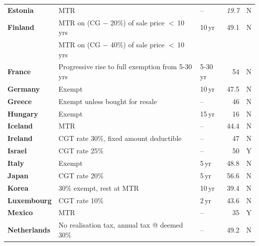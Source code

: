 \begin{subappendices}
\begin{table}
{\begin{tabular}[t]{>{\footnotesize}l>{\raggedleft\footnotesize}p{6.35cm}>{\raggedleft\footnotesize}p{1.20cm}>{\footnotesize}r>{\footnotesize\raggedleft\arraybackslash}p{1.40cm}}
 \textbf{Estonia}     & MTR                                                      & --                    & \textit{19.7}    & N \\
 \textbf{Finland}     & MTR on (CG $-$ 20\%) of sale price $<$\,10\,yrs          & {10\,yr}              & {49.1}           & {N} \\[-1pt]
                      & MTR on (CG $-$ 40\%) of sale price $<$\,10\,yrs          &                       &                  & \\[4pt]
 \textbf{France}      & Progressive rise to full exemption from 5-30\,yrs        & 5-30\,yr              & 54               & N \\
 \textbf{Germany}     & Exempt                                                   & 10\,yr                & 47.5             & N \\
 \textbf{Greece}      & Exempt unless bought for resale                          & --                    & 46               & N \\
 \textbf{Hungary}     & Exempt                                                   & 15\,yr                & 16               & N \\
 \textbf{Iceland}     & MTR                                                      & --                    & 44.4             & N \\
 \textbf{Ireland}     & CGT rate 30\%, fixed amount deductible                   & {--}                  & 47               & N \\
 \textbf{Israel}      & CGT rate 25\%                                            & --                    & 50               & Y \\
 \textbf{Italy}       & Exempt                                                   & 5\,yr                 & 48.8             & N \\
 \textbf{Japan}       & CGT rate 20\%                                            & 5\,yr                 & 56.6             & N \\
 \textbf{Korea}       & 30\% exempt, rest at MTR                                 & 10\,yr                & 39.4             & N \\
 \textbf{Luxembourg}  & CGT rate 10\%                                            & 2\,yr                 & 43.6             & N \\
 \textbf{Mexico}      & MTR                                                      & --                    & 35               & Y \\
 \textbf{Netherlands} & {{No realisation tax, annual tax @ deemed 30\%}}         & --                    & 49.2             & N \\

\end{tabular}}
\end{table}
\end{subappendices}
